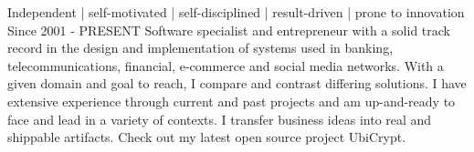 

\begin{cventries}
  \cventry
    {} %
    {Independent | self-motivated | self-disciplined | result-driven | prone to innovation} 
    {} %
    {Since 2001 - PRESENT} %
    {
      Software specialist and entrepreneur with a solid track record in the  design and implementation of systems used in banking, telecommunications, financial, e-commerce and social media networks.
      With a given domain and  goal to reach, I compare and contrast differing solutions. I have extensive experience through current and past projects and am up-and-ready to face and lead in a variety of contexts.
      I transfer business ideas into real and shippable artifacts. Check out my latest open source project UbiCrypt.
    }


\end{cventries}
